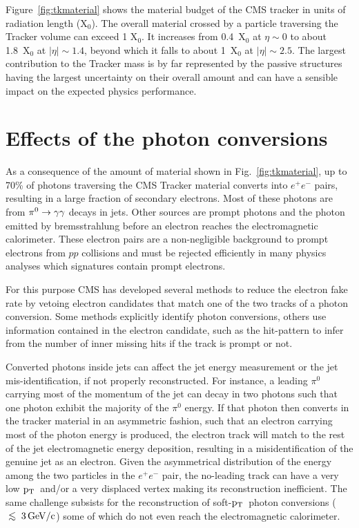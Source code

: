 \documentclass[a4paper]{jpconf}
\def\centeron#1#2{{\setbox0=\hbox{#1}\setbox1=\hbox{#2}\ifdim
\wd1>\wd0\kern.5\wd1\kern-.5\wd0\fi
\copy0\kern-.5\wd0\kern-.5\wd1\copy1\ifdim\wd0>\wd1
\kern.5\wd0\kern-.5\wd1\fi}}
\def\ltap{\;\centeron{\raise.35ex\hbox{$<$}}{\lower.65ex\hbox{$\sim$}}\;}
\def\lsim{\mathrel{\ltap}}
\def \pt{$\p_{\rm T}$~}
\begin{document}
Figure~\ref{fig:tkmaterial} shows the material budget of the CMS tracker in units of radiation length (X$_0$). 
The overall material crossed by a particle traversing the Tracker volume can exceed 1 X$_0$. 
It increases from 0.4~X$_0$ at $\eta \sim 0$ to about 1.8~X$_0$ at $|\eta| \sim 1.4$, beyond which it falls to about 1~X$_0$ at $|\eta| \sim 2.5$.
The largest contribution to the Tracker mass is by far represented by the passive structures having the largest uncertainty on their overall amount and can have a sensible impact on the expected physics performance. 



\section{Effects of the photon conversions}


As a consequence  of the amount of material shown in Fig.~\ref{fig:tkmaterial}, up to 70\% of photons traversing the CMS Tracker material converts into  $e^+ e^-$ pairs, resulting in a large fraction of secondary electrons. 
Most of these photons are from ${\rm \pi^0}  \to \gamma\gamma$ decays in jets. Other sources are prompt photons and the photon emitted by bremsstrahlung before an electron reaches the electromagnetic calorimeter. 
These electron pairs are  a non-negligible background to prompt electrons from $pp$ collisions and must be rejected efficiently in many physics analyses which signatures contain prompt electrons.

For this purpose 
CMS has developed several methods  to reduce the electron fake rate by  vetoing electron candidates that match one of the two tracks of a photon conversion. Some methods explicitly identify photon conversions, others use information contained in the electron candidate,  such as the hit-pattern to infer from the  number of inner missing hits if the track is prompt or not.

	
Converted photons inside jets can affect  the jet energy measurement or the jet mis-identification, if not properly reconstructed. 
For instance, a leading $\pi^0$ carrying most of the momentum of the jet can decay in two photons such that one photon exhibit the majority of the $\pi^0$ energy. If that photon then converts in the tracker material in an asymmetric fashion, such that an electron carrying most of the photon energy is produced, the electron track will match to the rest of the jet electromagnetic energy deposition, resulting in a misidentification of the genuine jet as an electron.
%
Given the asymmetrical distribution of the energy among the two particles in the $e^+ e^-$ pair, the no-leading track can have a very low \pt and/or a very displaced vertex making its 
 reconstruction inefficient.
 The same challenge subsists for the reconstruction of soft-\pt photon conversions ($\rm \lsim 3 \GeVc$) some of which do not even reach the electromagnetic calorimeter.
\end{document}
